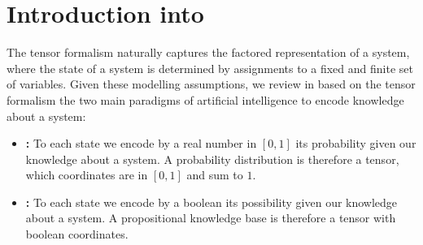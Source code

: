 \chapter{Introduction into }

The tensor formalism naturally captures the factored representation of a system, where the state of a system is determined by assignments to a fixed and finite set of variables.
Given these modelling assumptions, we review in  based on the tensor formalism the two main paradigms of artificial intelligence to encode knowledge about a system:
\begin{itemize}
    \item \textbf{\ProbabilityTheory{}:} To each state we encode by a real number in $[0,1]$ its probability given our knowledge about a system.
    A probability distribution is therefore a tensor, which coordinates are in $[0,1]$ and sum to $1$.
    \item \textbf{\PropositionalLogic{}:} To each state we encode by a boolean its possibility given our knowledge about a system.
    A propositional knowledge base is therefore a tensor with boolean coordinates.
\end{itemize}


